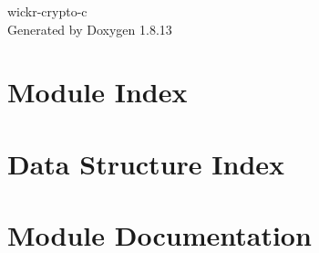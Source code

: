 \documentclass[twoside]{book}
\newcommand{\+}{\discretionary{\mbox{\scriptsize$\hookleftarrow$}}{}{}}
\newcommand{\clearemptydoublepage}{%
  \newpage{\pagestyle{empty}\cleardoublepage}%
}
\begin{document}
\hypersetup{pageanchor=false,
             bookmarksnumbered=true,
             pdfencoding=unicode
            }
\begin{titlepage}
\vspace*{7cm}
\begin{center}%
{\Large wickr-\/crypto-\/c }\\
\vspace*{1cm}
{\large Generated by Doxygen 1.8.13}\\
\end{center}
\end{titlepage}
\clearemptydoublepage
{}
\tableofcontents
\clearemptydoublepage
{}
\hypersetup{pageanchor=true}

\chapter{Module Index}

\chapter{Data Structure Index}

\chapter{Module Documentation}


























\end{document}
